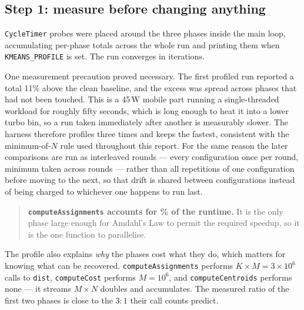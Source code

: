 \documentclass[11pt,a4paper]{article}
\begin{document}
\subsection{Step 1: measure before changing anything}
\label{sec:p6profile}

\texttt{CycleTimer} probes were placed around the three phases inside the main
loop, accumulating per-phase totals across the whole run and printing them when
\texttt{KMEANS\_PROFILE} is set. The run converges in \prognSixIters{}
iterations.

One measurement precaution proved necessary. The first profiled run reported a
total 11\% above the clean baseline, and the excess was spread across phases
that had not been touched. This is a 45\,W mobile part running a single-threaded
workload for roughly fifty seconds, which is long enough to heat it into a lower
turbo bin, so a run taken immediately after another is measurably slower. The
harness therefore profiles three times and keeps the fastest, consistent with
the minimum-of-$N$ rule used throughout this report. For the same reason the
later comparisons are run as interleaved rounds --- every configuration once
per round, minimum taken across rounds --- rather than all repetitions of one
configuration before moving to the next, so that drift is shared between
configurations instead of being charged to whichever one happens to run last.

\prognSixTableProfile

\begin{quote}
\textbf{\texttt{computeAssignments} accounts for \prognSixFPct\% of the
runtime.} It is the only phase large enough for Amdahl's Law to permit the
required speedup, so it is the one function to parallelise.
\end{quote}

The profile also explains \emph{why} the phases cost what they do, which
matters for knowing what can be recovered. \texttt{computeAssignments} performs
$K \times M = 3 \times 10^{6}$ calls to \texttt{dist}, \texttt{computeCost}
performs $M = 10^{6}$, and \texttt{computeCentroids} performs none --- it
streams $M \times N$ doubles and accumulates. The measured ratio of the first
two phases is close to the $3:1$ their call counts predict.
\end{document}
